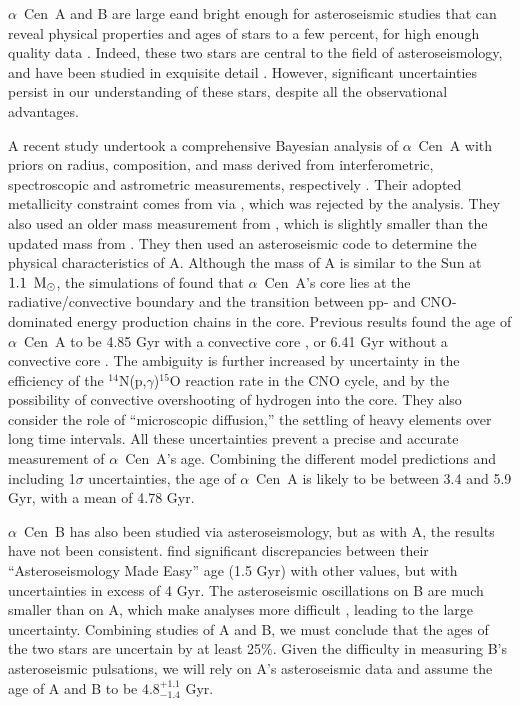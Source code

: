 \documentclass[preprint,12pt]{aastex}
\def\msun{{\rm\,M_\odot}}
\def\eg{{\it e.g.\ }}
\def\acen{{$\alpha$~Cen}}
\begin{document}
\acen~A and B are large eand bright enough for asteroseismic
studies that can reveal physical properties and ages of stars to a few
percent, for high enough quality data \citep{Chaplin2014}. Indeed, these two stars
are central to the field of asteroseismology, and have been studied in
exquisite detail \citep[e.g.][]{Bouchy01,Bouchy02}. However, significant uncertainties persist in our
understanding of these stars, despite all the observational
advantages.

A recent study undertook a comprehensive Bayesian analysis of \acen~A
with priors on radius, composition, and mass derived from
interferometric, spectroscopic and astrometric measurements,
respectively \citep{Bazot16}. Their adopted metallicity constraint
comes from \cite{NeuforgeMagain97} via \cite{Thoul03}, which was
rejected by the \cite{HinkelKane13} analysis. They also used an older
mass measurement from \cite{Pourbaix02}, which is slightly smaller
than the updated mass from \cite{PourbaixBoffin16}. They then used an
asteroseismic code to determine the physical characteristics of
A. Although the mass of A is similar to the Sun at $1.1~\msun$, the
simulations of \cite{Bazot16} found that \acen~A's core lies at the
radiative/convective boundary and the transition between pp- and
CNO-dominated energy production chains in the core. Previous results
found the age of \acen~A to be 4.85 Gyr with a convective core
\citep{Thevenin02}, or 6.41 Gyr without a convective core
\citep{Thoul03}. The ambiguity is further increased by uncertainty in
the efficiency of the $^{14}$N(p,$\gamma$)$^{15}$O reaction rate in
the CNO cycle, and by the possibility of
convective overshooting of hydrogen into the core. They also consider
the role of ``microscopic diffusion,'' the settling of heavy
elements over long time intervals. All these uncertainties
prevent a precise and accurate measurement of \acen~A's
age. Combining the different model predictions and including 1$\sigma$
uncertainties, the age of \acen~A is likely to be between 3.4 and 5.9 Gyr,
with a mean of 4.78 Gyr.

\acen~B has also been studied via asteroseismology, but as with A, the
results have not been consistent. \cite{Lundkvist14} find significant
discrepancies between their ``Asteroseismology Made Easy'' age (1.5
Gyr) with other values, but with uncertainties in excess of 4 Gyr. The
asteroseismic oscillations on B are much smaller than on A, which make
analyses more difficult \citep[see, \eg,][]{CarrierBourban03},
leading to the large uncertainty. Combining studies of A and B, we
must conclude that the ages of the two stars are uncertain by at least
25\%. Given the difficulty in measuring B's asteroseismic pulsations,
we will rely on A's asteroseismic data and assume the age of A and B
to be $4.8^{+1.1}_{-1.4}$ Gyr.
\end{document}

